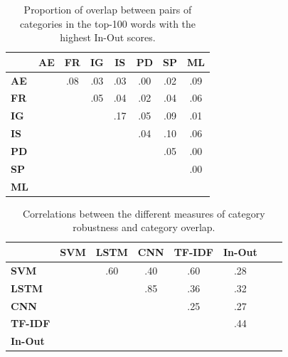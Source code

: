 \documentclass[letterpaper, 12 pt, conference]{ieeeconf}
\begin{document}
\begin{table}[tp!]
    \centering
    \begin{tabular}{lccccccc}
        \toprule
            &
            \multicolumn{1}{c}{\textbf{AE}} & \multicolumn{1}{c}{\textbf{FR}} & \multicolumn{1}{c}{\textbf{IG}} & \multicolumn{1}{c}{\textbf{IS}} & \multicolumn{1}{c}{\textbf{PD}} & \multicolumn{1}{c}{\textbf{SP}} & \multicolumn{1}{c}{\textbf{ML}} \\
        \midrule
            \textbf{AE} & & .08 & .03 & .03 & .00 & .02 & .09 \\
            \textbf{FR} & &     & .05 & .04 & .02 & .04 & .06 \\
            \textbf{IG} & &     &     & .17 & .05 & .09 & .01 \\
            \textbf{IS} & &     &     &     & .04 & .10 & .06 \\ 
            \textbf{PD} & &     &     &     &     & .05 & .00 \\ 
            \textbf{SP} & &     &     &     &     &     & .00 \\ 
            \textbf{ML} & &     &     &     &     &     &     \\ 
        \bottomrule
    \end{tabular}
    \caption{Proportion of overlap between pairs of categories in the top-100 words with the highest In-Out scores.}
    \label{table:over-inout}
\end{table}
\begin{table}[tp!]
    \centering
    \begin{tabular}{lccccccc}
        \toprule
            &
            \multicolumn{1}{c}{\textbf{SVM}} & \multicolumn{1}{c}{\textbf{LSTM}} & \multicolumn{1}{c}{\textbf{CNN}} & \multicolumn{1}{c}{\textbf{TF-IDF}} & \multicolumn{1}{c}{\textbf{In-Out}} \\
        \midrule
            \textbf{SVM}    & & .60 & .40 & .60 & .28 \\
            \textbf{LSTM}   & &     & .85 & .36 & .32 \\
            \textbf{CNN}    & &     &     & .25 & .27 \\
            \textbf{TF-IDF} & &     &     &     & .44 \\ 
            \textbf{In-Out} & &     &     &     &     \\ 
        \bottomrule
    \end{tabular}
    \caption{Correlations between the different measures of category robustness and category overlap.}
    \label{table:correlations}
\end{table}
\end{document}
